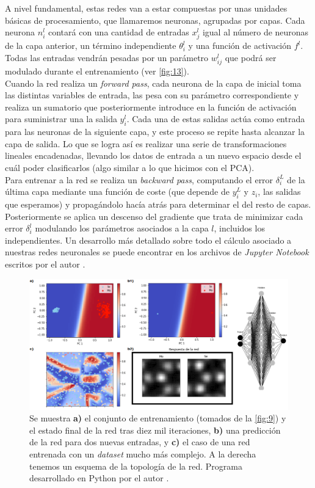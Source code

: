 A nivel fundamental, estas redes van a estar compuestas por unas unidades básicas de procesamiento, que llamaremos neuronas, agrupadas por capas. Cada neurona $n_i^l$ contará con una cantidad de entradas $x_j^l$ igual al número de neuronas de la capa anterior, un término independiente $\theta_i^l$ y una función de activación $f^l$. Todas las entradas vendrán pesadas por un parámetro $w_{ij}^l$ que podrá ser modulado durante el entrenamiento (ver \autoref{fig:13}).\\

Cuando la red realiza un \textit{forward pass}, cada neurona de la capa de inicial toma las distintas variables de entrada, las pesa con su parámetro correspondiente y realiza un sumatorio que posteriormente introduce en la función de activación para suministrar una la salida $y_i^l$. Cada una de estas salidas actúa como entrada para las neuronas de la siguiente capa, y este proceso se repite hasta alcanzar la capa de salida. Lo que se logra así es realizar una serie de transformaciones lineales encadenadas, llevando los datos de entrada a un nuevo espacio desde el cuál poder clasificarlos (algo similar a lo que hicimos con el PCA).\\

\newpage
Para entrenar a la red se realiza un \textit{backward pass}, computando el error $\delta_i^L $ de la última capa mediante una función de coste (que depende de $y_i^L$ y $z_i$, las salidas que esperamos) y propagándolo hacía atrás para determinar el del resto de capas. Posteriormente se aplica un descenso del gradiente que trata de minimizar cada error $\delta_i^l$ modulando los parámetros asociados a la capa $l$, incluidos los independientes. Un desarrollo más detallado sobre todo el cálculo asociado a nuestras redes neuronales se puede encontrar en los archivos de \textit{Jupyter Notebook} escritos por el autor \cite{repo}.\\

\begin{figure}[h!]
    \centering
    \includegraphics[width=1\textwidth]{fig/Fig14.png}
    \caption{Se muestra \textbf{a)} el conjunto de entrenamiento (tomados de la \autoref{fig:9}) y el estado final de la red tras diez mil iteraciones, \textbf{b)} una predicción de la red para dos nuevas entradas, y \textbf{c)} el caso de una red entrenada con un \textit{dataset} mucho más complejo. A la derecha tenemos un esquema de la topología de la red. Programa desarrollado en Python por el autor \cite{repo}.}
    \label{fig:14}
\end{figure}

